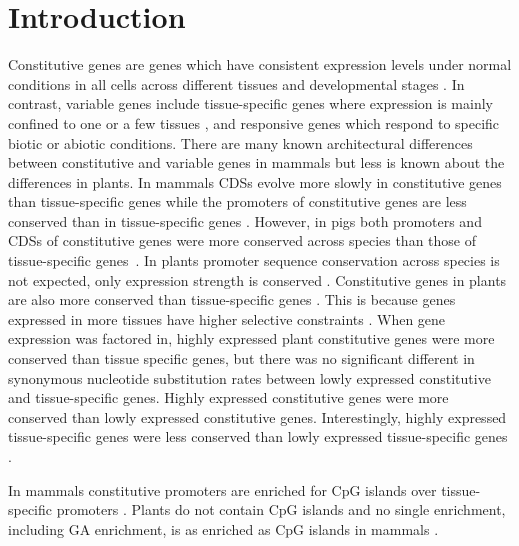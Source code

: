 \documentclass[../main.tex]{subfiles}
\begin{document}
\section{Introduction}
\label{chapter1:introduction}
Constitutive genes are genes which have consistent expression levels under normal conditions in all cells across different tissues and developmental stages \autocite{zhangMammalianHousekeepingGenes2004,butteFurtherDefiningHousekeeping2001}.
In contrast, variable genes include tissue-specific genes where expression is mainly confined to one or a few tissues \autocite{butteFurtherDefiningHousekeeping2001,schugPromoterFeaturesRelated2005}, and responsive genes which respond to specific biotic or abiotic conditions.
There are many known architectural differences between constitutive and variable genes in mammals but less is known about the differences in plants.
In mammals CDSs evolve more slowly in constitutive genes than tissue\hyp{}specific genes \autocite{zhangMammalianHousekeepingGenes2004} while the promoters of constitutive genes are less conserved than in tissue-specific genes \autocite{farreHousekeepingGenesTend2007,carninciGenomewideAnalysisMammalian2006}.
However, in pigs both promoters and CDSs of constitutive genes were more conserved across species than those of tissue-specific genes~\autocite{weiCharacterizationGenePromoters2019}.
In plants promoter sequence conservation across species is not expected, only expression strength is conserved \autocite{armisenUniqueGenesPlants2008}.
Constitutive genes in plants are also more conserved than tissue-specific genes \autocite{armisenUniqueGenesPlants2008,wrightEffectsGeneExpression2004,mukhopadhyayDifferentialSelectiveConstraints2008}.
This is because genes expressed in more tissues have higher selective constraints \autocite{wrightEffectsGeneExpression2004}.
When gene expression was factored in, highly expressed plant constitutive genes were more conserved than tissue specific genes, but there was no significant different in synonymous nucleotide substitution rates between lowly expressed constitutive and tissue-specific genes.
Highly expressed constitutive genes were more conserved than lowly expressed constitutive genes.
Interestingly, highly expressed tissue-specific genes were less conserved than lowly expressed tissue-specific genes \autocite{mukhopadhyayDifferentialSelectiveConstraints2008}.

In mammals constitutive promoters are enriched for CpG islands over tissue-specific promoters \autocite{carninciGenomewideAnalysisMammalian2006}.
Plants do not contain CpG islands \autocite{kapranovTranscriptionStartSite2009} and no single enrichment, including GA enrichment, is as enriched as CpG islands in mammals \autocite{megrawTranscriptionFactorAffinitybased2009}.
\end{document}
